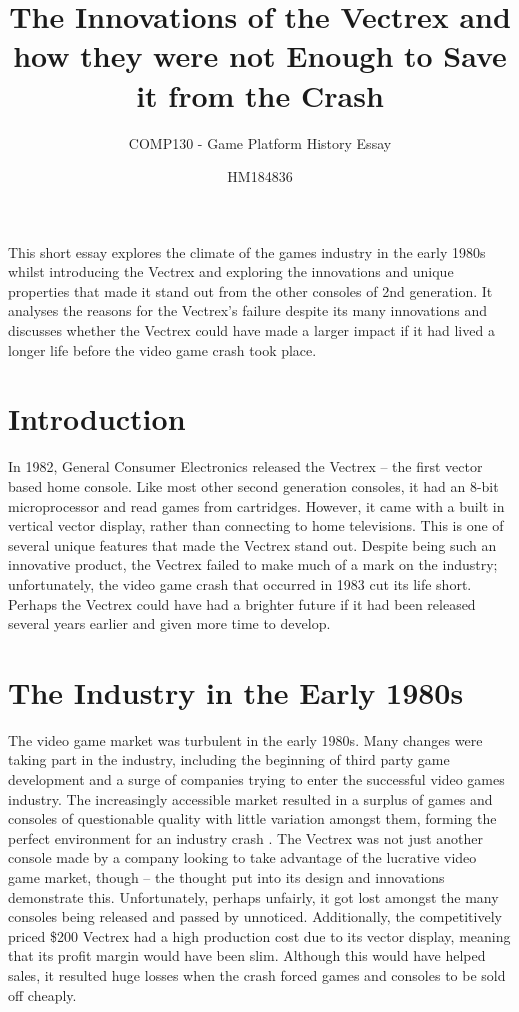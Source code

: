\documentclass{scrartcl}
\title{The Innovations of the Vectrex and how they were not Enough to Save it from the Crash}
\subtitle{COMP130 - Game Platform History Essay}
\author{HM184836}
\begin{document}
\maketitle


\abstract
{
This short essay explores the climate of the games industry in the early 1980s whilst introducing the Vectrex and exploring the innovations and unique properties that made it stand out from the other consoles of 2nd generation. It analyses the reasons for the Vectrex's failure despite its many innovations and discusses whether the Vectrex could have made a larger impact if it had lived a longer life before the video game crash took place.
}



\section*{Introduction}
In 1982, General Consumer Electronics released the Vectrex -- the first vector based home console. Like most other second generation consoles, it had an 8-bit microprocessor and read games from cartridges. However, it came with a built in vertical vector display, rather than connecting to home televisions. This is one of several unique features that made the Vectrex stand out. Despite being such an innovative product, the Vectrex failed to make much of a mark on the industry; unfortunately, the video game crash that occurred in 1983 cut its life short. Perhaps the Vectrex could have had a brighter future if it had been released several years earlier and given more time to develop.



\section*{The Industry in the Early 1980s}
The video game market was turbulent in the early 1980s. Many changes were taking part in the industry, including the beginning of third party game development and a surge of companies trying to enter the successful video games industry\cite{wolf:pong}. The increasingly accessible market resulted in a surplus of games and consoles of questionable quality with little variation amongst them, forming the perfect environment for an industry crash \cite{ernkvist:crash}. The Vectrex was not just another console made by a company looking to take advantage of the lucrative video game market, though -- the thought put into its design and innovations demonstrate this. Unfortunately, perhaps unfairly, it got lost amongst the many consoles being released and passed by unnoticed. Additionally, the competitively priced \$200\cite{defanti:impact} Vectrex had a high production cost due to its vector display, meaning that its profit margin would have been slim. Although this would have helped sales, it resulted huge losses when the crash forced games and consoles to be sold off cheaply\cite{baer:supercade}.
\end{document}

